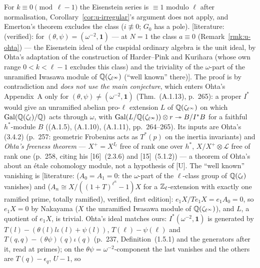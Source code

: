 \documentclass[11pt]{article}
\newcommand{\LIT}[1]{\textsf{[literature: #1]}}   %
\newcommand{\ee}{\epsilon}                        %
\begin{document}
\begin{remark}\label{rmk:u-classzero}
For $k\equiv0\pmod{\ell-1}$ the Eisenstein series is $\equiv1$ modulo $\ell$ after normalisation, Corollary~\ref{cor:u-irregular}'s argument does not
apply, and Emerton's theorem excludes the class ($i\not\equiv0$; $G_0$ has a pole). \LIT{\cite[Thm.~(1.5.5), last clause, p.~238, proved in Appendix~A.1,
p.~265]{ohta_cong} (verified): for $(\theta,\psi)=(\omega^{-2},\mathbf1)$ --- at $N=1$ the class $a\equiv0$ (Remark~\ref{rmk:u-ohta}) --- the Eisenstein ideal of
the cuspidal ordinary algebra is the unit ideal, by Ohta's adaptation \cite[App.~A.1]{ohta_cong} of the construction of Harder--Pink and
Kurihara \cite[\S3]{kurihara1993} (whose own range $0<k<\ell-1$ excludes this class) and the triviality of the $\omega$-part of the unramified Iwasawa
module of $\mathbb{Q}(\zeta_{\ell^\infty})$ (``well known'' there)}. The proof is by contradiction and \emph{does not use the main conjecture}, which enters Ohta's
Appendix~A only for $(\theta,\psi)\ne(\omega^{-2},\mathbf1)$ (Thm.~(A.1.13), p.~265): a proper $I^{*}$ would give an unramified abelian pro-$\ell$ extension $L$ of
$\mathbb{Q}(\zeta_{\ell^\infty})$ on which $\mathrm{Gal}(\mathbb{Q}(\zeta_\ell)/\mathbb{Q})$ acts through $\omega$, with $\mathrm{Gal}(L/\mathbb{Q}(\zeta_{\ell^\infty}))\otimes r\twoheadrightarrow B/I^{*}B$ for a faithful
$h^{*}$-module $B$ ((A.1.5), (A.1.10), (A.1.11), pp.~264--265). Its inputs are Ohta's (3.4.2) (p.~257: geometric Frobenius acts as $T^{*}(p)$ on the inertia
invariants) and \emph{Ohta's freeness theorem} --- $X^{+}=X^{I_\ell}$ free of rank one over $h^{*}$, $X/X^{+}\otimes\mathcal L$ free of rank one (p.~258, citing his
[16]~(2.3.6) and [15]~(5.1.2)) --- a theorem of Ohta's about an \'etale cohomology module, not a hypothesis of [U]. The ``well known'' vanishing is
\LIT{\cite[Prop.~6.16, p.~102]{washington1st} ($A_0=A_1=0$: the $\omega$-part of the $\ell$-class group of $\mathbb{Q}(\zeta_\ell)$ vanishes) and \cite[Prop.~13.22,
p.~284]{washington1st} ($A_n\cong X/((1+T)^{\ell^{n}}-1)X$ for a $\mathbb{Z}_\ell$-extension with exactly one ramified prime, totally ramified), verified, first edition}:
$e_1X/Te_1X=e_1A_0=0$, so $e_1X=0$ by Nakayama ($X$ the unramified Iwasawa module of $\mathbb{Q}(\zeta_{\ell^\infty})$), and $L$, a quotient of $e_1X$, is trivial.
Ohta's ideal matches ours: $I^{*}(\omega^{-2},\mathbf1)$ is generated by $T(l)-(\theta(l)l\iota(l)+\psi(l))$, $T(\ell)-\psi(\ell)$ and $T(q,q)-(\theta\psi)(q)\iota(q)$
(p.~237, Definition~(1.5.1) and the generators after it, read at primes); on the $\theta\psi=\omega^{-2}$-component the last vanishes and the others are $T(q)-\ee_q$, $U-1$, so

\end{remark}
\end{document}
